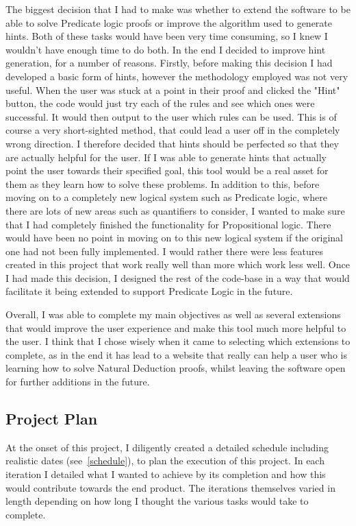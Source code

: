 The biggest decision that I had to make was whether to extend the software to be able to solve Predicate logic proofs or improve the algorithm used to generate hints. Both of these tasks would have been very time consuming, so I knew I wouldn't have enough time to do both. In the end I decided to improve hint generation, for a number of reasons. Firstly, before making this decision I had developed a basic form of hints, however the methodology employed was not very useful. When the user was stuck at a point in their proof and clicked the "Hint" button,  the code would just try each of the rules and see which ones were successful. It would then output to the user which rules can be used. This is of course a very short-sighted method, that could lead a user off in the completely wrong direction. I therefore decided that hints should be perfected so that they are actually helpful for the user. If I was able to generate hints that actually point the user towards their specified goal, this tool would be a real asset for them as they learn how to solve these problems. In addition to this, before moving on to a completely new logical system such as Predicate logic, where there are lots of new areas such as quantifiers to consider, I wanted to make sure that I had completely finished the functionality for Propositional logic. There would have been no point in moving on to this new logical system if the original one had not been fully implemented. I would rather there were less features created in this project that work really well than more which work less well. Once I had made this decision, I designed the rest of the code-base in a way that would facilitate it being extended to support Predicate Logic in the future. 

Overall, I was able to complete my main objectives as well as several extensions that would improve the user experience and make this tool much more helpful to the user. I think that I chose wisely when it came to selecting which extensions to complete, as in the end it has lead to a website that really can help a user who is learning how to solve Natural Deduction proofs, whilst leaving the software open for further additions in the future.

\subsection{Project Plan}

At the onset of this project, I diligently created a detailed schedule including realistic dates (see~\ref{schedule}), to plan the execution of this project. In each iteration I detailed what I wanted to achieve by its completion and how this would contribute towards the end product. The iterations themselves varied in length depending on how long I thought the various tasks would take to complete.

